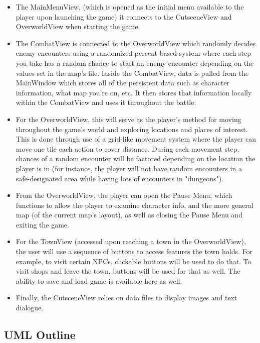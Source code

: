 \documentclass[10pt,conference,onecolumn,compsoc]{IEEEtran}
\begin{document}
\begin{itemize}

\item The MainMenuView, (which is opened as the initial menu available to the player upon launching the game) it connects to the CutsceneView and OverworldView when starting the game.

\item The CombatView is connected to the OverworldView which randomly decides enemy encounters using a randomized percent-based system where each step you take has a random chance to start an enemy encounter depending on the values set in the map's file. Inside the CombatView, data is pulled from the MainWindow which stores all of the persistent data such as character information, what map you're on, etc. It then stores that information locally within the CombatView and uses it throughout the battle.

\item For the OverworldView, this will serve as the player's method for moving throughout the game's world and exploring locations and places of interest. This is done through use of a grid-like movement system where the player can move one tile each action to cover distance. During each movement step, chances of a random encounter will be factored depending on the location the player is in (for instance, the player will not have random encounters in a safe-designated area while having lots of encounters in "dungeons").

\item From the OverworldView, the player can open the Pause Menu, which functions to allow the player to examine character info, and the more general map (of the current map's layout), as well as closing the Pause Menu and exiting the game.

\item For the TownView (accessed upon reaching a town in the OverworldView), the user will use a sequence of buttons to access features the town holds. For example, to visit certain NPCs, clickable buttons will be used to do that. To visit shops and leave the town, buttons will be used for that as well. The ability to save and load game is available here as well.

\item Finally, the CutsceneView relies on data files to display images and text dialogue.

\end{itemize}

\subsection{UML Outline}
\end{document}
